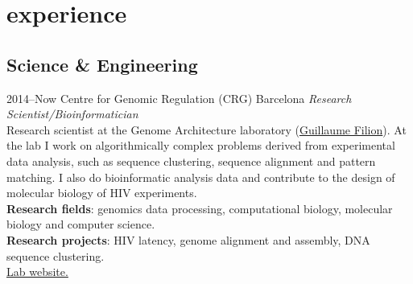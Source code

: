 \documentclass[]{friggeri-cv} %
\begin{document}

\section{experience}

\subsection{Science \& Engineering}

\begin{entrylist}


\entry
{2014--Now}
{Centre for Genomic Regulation (CRG)}
{Barcelona}
{%
\emph{Research Scientist/Bioinformatician} \\
Research scientist at the Genome Architecture laboratory
(\href{http://blog.thegrandlocus.com/}{Guillaume Filion}). At the lab
I work on algorithmically complex problems derived from experimental
data analysis, such as sequence clustering, sequence alignment and
pattern matching. I also do bioinformatic analysis data and
contribute to the design of molecular biology  of HIV experiments.\\
{\bf Research fields}: genomics data processing, computational biology,
molecular biology and computer science. \\
{\bf Research projects}: HIV latency, genome alignment and assembly, DNA
sequence clustering.\\
\href{http://www.genomearchitecture.com}{{\FA \faExternalLink} Lab website.}
}


\end{entrylist}
\end{document}
